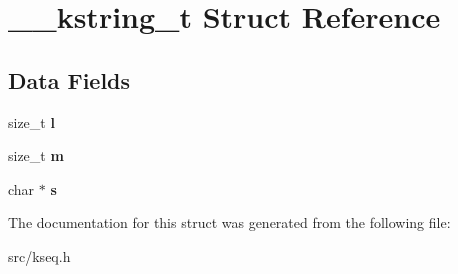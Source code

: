 \hypertarget{struct____kstring__t}{}\section{\+\_\+\+\_\+kstring\+\_\+t Struct Reference}
\label{struct____kstring__t}
\subsection*{Data Fields}
\begin{DoxyCompactItemize}
\item 
\mbox{\label{struct____kstring__t_a79e51a81cb72d75e81bf481ba8ff12c8}} 
size\+\_\+t {\bfseries l}
\item 
\mbox{\label{struct____kstring__t_a29c59f01909db677b4b1d085c33143ca}} 
size\+\_\+t {\bfseries m}
\item 
\mbox{\label{struct____kstring__t_ad1e0ec549fb62509c1a5d0cbd5a7983f}} 
char $\ast$ {\bfseries s}
\end{DoxyCompactItemize}


The documentation for this struct was generated from the following file\+:\begin{DoxyCompactItemize}
\item 
src/kseq.\+h\end{DoxyCompactItemize}
